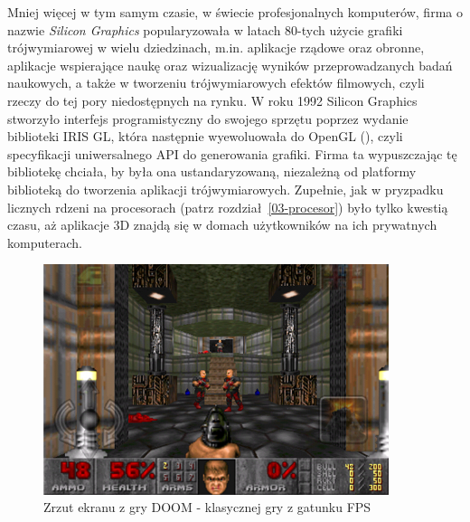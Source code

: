 Mniej więcej w tym samym czasie, w świecie profesjonalnych komputerów, firma o nazwie \emph{Silicon Graphics} popularyzowała w latach 80-tych użycie grafiki trójwymiarowej w wielu dziedzinach, m.in. aplikacje rządowe oraz obronne, aplikacje wspierające naukę oraz wizualizację wyników przeprowadzanych badań naukowych, a także w tworzeniu trójwymiarowych efektów filmowych, czyli rzeczy do tej pory niedostępnych na rynku. W roku 1992 Silicon Graphics stworzyło interfejs programistyczny do swojego sprzętu poprzez wydanie biblioteki IRIS GL, która następnie wyewoluowała do OpenGL (), czyli specyfikacji uniwersalnego API do generowania grafiki. Firma ta wypuszczając tę bibliotekę chciała, by była ona ustandaryzowaną, niezależną od platformy biblioteką do tworzenia aplikacji trójwymiarowych. Zupełnie, jak w pryzpadku licznych rdzeni na procesorach (patrz rozdział~\ref{03-procesor}) było tylko kwestią czasu, aż aplikacje 3D znajdą się w domach użytkowników na ich prywatnych komputerach.

\begin{figure}[ht]
\centering\includegraphics[width=0.9\textwidth]{figures/03/doom.png}
\caption{Zrzut ekranu z gry DOOM - klasycznej gry z gatunku FPS}\label{rys:doom}
\end{figure}

